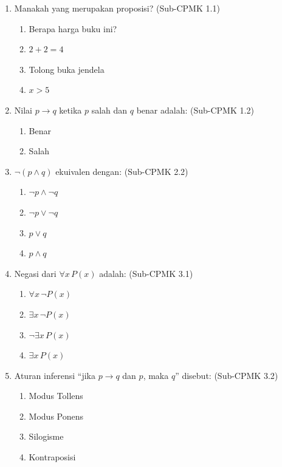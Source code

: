\begin{enumerate}
  \item Manakah yang merupakan proposisi? (Sub-CPMK 1.1)
  \begin{enumerate}
    \item Berapa harga buku ini?
    \item $2 + 2 = 4$
    \item Tolong buka jendela
    \item $x > 5$
  \end{enumerate}
  
  \item Nilai $p \rightarrow q$ ketika $p$ salah dan $q$ benar adalah: (Sub-CPMK 1.2)
  \begin{enumerate}
    \item Benar
    \item Salah
  \end{enumerate}
  
  \item $\neg(p \wedge q)$ ekuivalen dengan: (Sub-CPMK 2.2)
  \begin{enumerate}
    \item $\neg p \wedge \neg q$
    \item $\neg p \vee \neg q$
    \item $p \vee q$
    \item $p \wedge q$
  \end{enumerate}
  
  \item Negasi dari $\forall x \, P(x)$ adalah: (Sub-CPMK 3.1)
  \begin{enumerate}
    \item $\forall x \, \neg P(x)$
    \item $\exists x \, \neg P(x)$
    \item $\neg \exists x \, P(x)$
    \item $\exists x \, P(x)$
  \end{enumerate}
  
  \item Aturan inferensi ``jika $p \rightarrow q$ dan $p$, maka $q$'' disebut: (Sub-CPMK 3.2)
  \begin{enumerate}
    \item Modus Tollens
    \item Modus Ponens
    \item Silogisme
    \item Kontraposisi
  \end{enumerate}
  

\end{enumerate}
